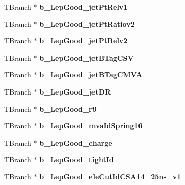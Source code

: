 \begin{DoxyCompactItemize}
\item 
\hypertarget{classMiniTree_a8eb295b148687fffe019b45a4f331807}{}\label{classMiniTree_a8eb295b148687fffe019b45a4f331807} 
T\+Branch $\ast$ {\bfseries b\+\_\+\+Lep\+Good\+\_\+jet\+Pt\+Relv1}
\item 
\hypertarget{classMiniTree_aa8829a676ca014c7c877956525842373}{}\label{classMiniTree_aa8829a676ca014c7c877956525842373} 
T\+Branch $\ast$ {\bfseries b\+\_\+\+Lep\+Good\+\_\+jet\+Pt\+Ratiov2}
\item 
\hypertarget{classMiniTree_a691c2d39d89f3862d6237c9db4f154ed}{}\label{classMiniTree_a691c2d39d89f3862d6237c9db4f154ed} 
T\+Branch $\ast$ {\bfseries b\+\_\+\+Lep\+Good\+\_\+jet\+Pt\+Relv2}
\item 
\hypertarget{classMiniTree_a562ec77e72feb7d0b81cd46803d1d031}{}\label{classMiniTree_a562ec77e72feb7d0b81cd46803d1d031} 
T\+Branch $\ast$ {\bfseries b\+\_\+\+Lep\+Good\+\_\+jet\+B\+Tag\+C\+SV}
\item 
\hypertarget{classMiniTree_a24c6f241a7b791065d3b8e7b26061fa6}{}\label{classMiniTree_a24c6f241a7b791065d3b8e7b26061fa6} 
T\+Branch $\ast$ {\bfseries b\+\_\+\+Lep\+Good\+\_\+jet\+B\+Tag\+C\+M\+VA}
\item 
\hypertarget{classMiniTree_a1e97aa4d060cb7d11fcb3f2ef78d62b8}{}\label{classMiniTree_a1e97aa4d060cb7d11fcb3f2ef78d62b8} 
T\+Branch $\ast$ {\bfseries b\+\_\+\+Lep\+Good\+\_\+jet\+DR}
\item 
\hypertarget{classMiniTree_ad4c3ca71f6458f807e62fc61b89d84ca}{}\label{classMiniTree_ad4c3ca71f6458f807e62fc61b89d84ca} 
T\+Branch $\ast$ {\bfseries b\+\_\+\+Lep\+Good\+\_\+r9}
\item 
\hypertarget{classMiniTree_a1d14feb44969d5953d2885415397c7b3}{}\label{classMiniTree_a1d14feb44969d5953d2885415397c7b3} 
T\+Branch $\ast$ {\bfseries b\+\_\+\+Lep\+Good\+\_\+mva\+Id\+Spring16}
\item 
\hypertarget{classMiniTree_a60bd898bbe61400c9a818bcacbdaf9aa}{}\label{classMiniTree_a60bd898bbe61400c9a818bcacbdaf9aa} 
T\+Branch $\ast$ {\bfseries b\+\_\+\+Lep\+Good\+\_\+charge}
\item 
\hypertarget{classMiniTree_a0a5c6a40a6aeb2d27efcfb53fba23a5d}{}\label{classMiniTree_a0a5c6a40a6aeb2d27efcfb53fba23a5d} 
T\+Branch $\ast$ {\bfseries b\+\_\+\+Lep\+Good\+\_\+tight\+Id}
\item 
\hypertarget{classMiniTree_a23a514c588d6ad1ed07e185979f46df2}{}\label{classMiniTree_a23a514c588d6ad1ed07e185979f46df2} 
T\+Branch $\ast$ {\bfseries b\+\_\+\+Lep\+Good\+\_\+ele\+Cut\+Id\+C\+S\+A14\+\_\+25ns\+\_\+v1}
\item 

\end{DoxyCompactItemize}
